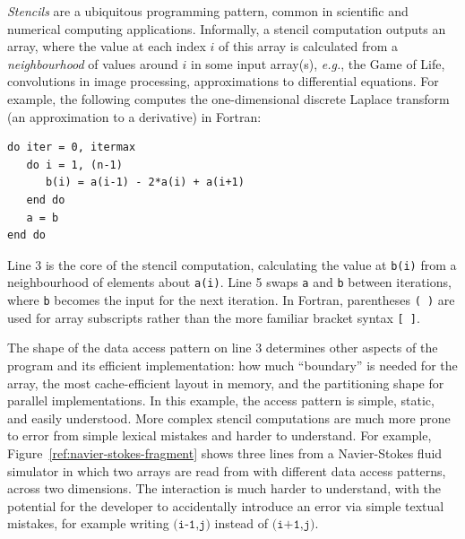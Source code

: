 \documentclass[9pt]{sigplanconf}
\theoremstyle{definition}
\newcommand{\eg}{\emph{e.g.}}
\begin{document}
\emph{Stencils} are a ubiquitous programming pattern, common in
scientific and numerical computing applications. Informally, a stencil
computation outputs an array, where the value at each index $i$ of
this array is calculated from a \emph{neighbourhood} of values around $i$ in
some input array(s), \eg{}, the Game of Life, convolutions in image
processing, approximations to differential equations. For example, the
following computes the one-dimensional discrete Laplace
transform (an approximation to a derivative) in Fortran:
%
\begin{verbatim}
do iter = 0, itermax
   do i = 1, (n-1)
      b(i) = a(i-1) - 2*a(i) + a(i+1)
   end do
   a = b
end do
\end{verbatim}
%
Line 3 is the core of the stencil computation, calculating
the value at \texttt{b(i)} from a neighbourhood of elements about
\texttt{a(i)}. Line 5 swaps
\texttt{a} and \texttt{b} between iterations, where \texttt{b} becomes the
input for the next iteration. In Fortran, parentheses \texttt{( )} are used
for array subscripts rather than the more familiar bracket syntax \texttt{[ ]}.

The shape of the data access pattern on line 3 determines other aspects of the
program and its efficient implementation: how much ``boundary'' is
needed for the array, the most cache-efficient layout in memory,
and the partitioning shape for parallel implementations.
In this example, the access pattern is simple, static, and easily
understood. More complex stencil computations
are much more prone to error from simple lexical mistakes and
harder to understand. For example,
Figure~\ref{ref:navier-stokes-fragment} shows three lines from a
Navier-Stokes fluid simulator in which two arrays are read from with
different data access patterns, across two dimensions. The interaction
is much harder to understand, with the potential for the developer to
accidentally introduce an error via simple textual mistakes, for
example writing $\texttt{(i-1,j)}$ instead of $\texttt{(i+1,j)}$.
\end{document}
